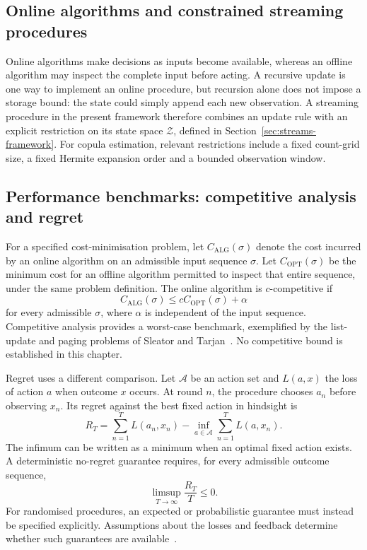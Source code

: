 \subsection{Online algorithms and constrained streaming procedures}
Online algorithms make decisions as inputs become available, whereas an offline algorithm may inspect the complete input before acting. A recursive update is one way to implement an online procedure, but recursion alone does not impose a storage bound: the state could simply append each new observation. A streaming procedure in the present framework therefore combines an update rule with an explicit restriction on its state space $\mathcal Z$, defined in Section~\ref{sec:streams-framework}. For copula estimation, relevant restrictions include a fixed count-grid size, a fixed Hermite expansion order and a bounded observation window.

\subsection{Performance benchmarks: competitive analysis and regret}
For a specified cost-minimisation problem, let $C_{\mathrm{ALG}}(\sigma)$ denote the cost incurred by an online algorithm on an admissible input sequence $\sigma$. Let $C_{\mathrm{OPT}}(\sigma)$ be the minimum cost for an offline algorithm permitted to inspect that entire sequence, under the same problem definition. The online algorithm is $c$-competitive if
\[
 C_{\mathrm{ALG}}(\sigma)\leq c C_{\mathrm{OPT}}(\sigma)+\alpha
\]
for every admissible $\sigma$, where $\alpha$ is independent of the input sequence. Competitive analysis provides a worst-case benchmark, exemplified by the list-update and paging problems of Sleator and Tarjan~\cite{sleator_tarjan_1985}. No competitive bound is established in this chapter.

Regret uses a different comparison. Let $\mathcal A$ be an action set and $L(a,x)$ the loss of action $a$ when outcome $x$ occurs. At round $n$, the procedure chooses $a_n$ before observing $x_n$. Its regret against the best fixed action in hindsight is
\[
 R_T=\sum_{n=1}^{T}L(a_n,x_n)
       -\inf_{a\in\mathcal A}\sum_{n=1}^{T}L(a,x_n).
\]
The infimum can be written as a minimum when an optimal fixed action exists. A deterministic no-regret guarantee requires, for every admissible outcome sequence,
\[
 \limsup_{T\to\infty}\frac{R_T}{T}\leq 0.
\]
For randomised procedures, an expected or probabilistic guarantee must instead be specified explicitly. Assumptions about the losses and feedback determine whether such guarantees are available~\cite{hazan_2022}.

